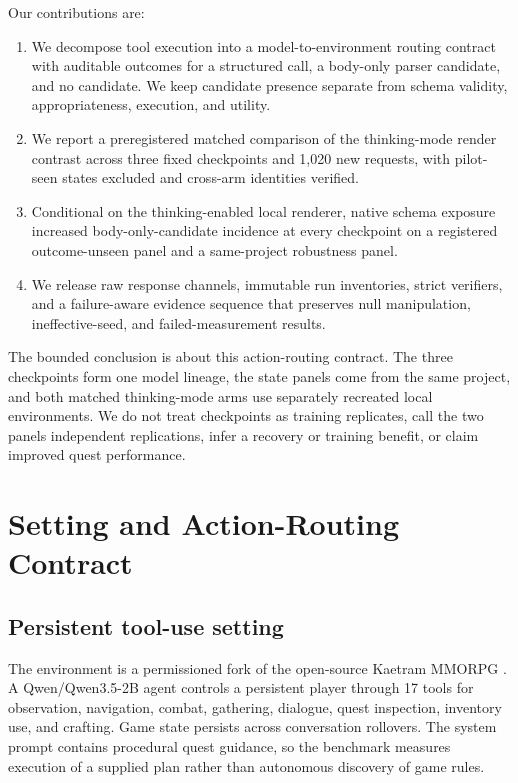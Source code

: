 \documentclass[10pt]{article}
\begin{document}
Our contributions are:

\begin{enumerate}
  \item We decompose tool execution into a model-to-environment routing contract
  with auditable outcomes for a structured call, a body-only parser candidate,
  and no candidate. We keep candidate presence separate from schema validity,
  appropriateness, execution, and utility.
  \item We report a preregistered matched comparison of the thinking-mode render
  contrast across three fixed checkpoints and 1,020 new requests, with
  pilot-seen states excluded and cross-arm identities verified.
  \item Conditional on the thinking-enabled local renderer, native schema
  exposure increased body-only-candidate incidence at every checkpoint on a
  registered outcome-unseen panel and a same-project robustness panel.
  \item We release raw response channels, immutable run inventories, strict
  verifiers, and a failure-aware evidence sequence that preserves null
  manipulation, ineffective-seed, and failed-measurement results.
\end{enumerate}

The bounded conclusion is about this action-routing contract. The three
checkpoints form one model lineage, the state panels come from the same project,
and both matched thinking-mode arms use separately recreated local environments.
We do not treat checkpoints as training replicates, call the two panels
independent replications, infer a recovery or training benefit, or claim
improved quest performance.

\section{Setting and Action-Routing Contract}

\subsection{Persistent tool-use setting}

The environment is a permissioned fork of the open-source Kaetram MMORPG
\citep{kaetram2026}. A Qwen/Qwen3.5-2B agent \citep{qwen35modelcards2026}
controls a persistent player through 17 tools for observation, navigation,
combat, gathering, dialogue, quest inspection, inventory use, and crafting.
Game state persists across conversation rollovers. The system prompt contains
procedural quest guidance, so the benchmark measures execution of a supplied
plan rather than autonomous discovery of game rules.
\end{document}
